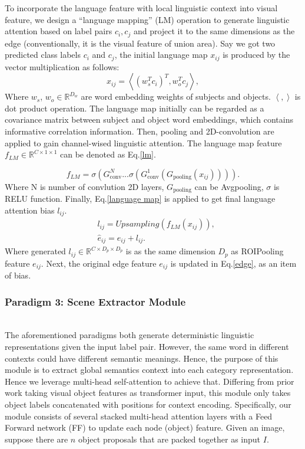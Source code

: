 \documentclass[runningheads]{llncs}
\begin{document}
To incorporate	the language feature with local linguistic context into visual
feature, we design a ``language mapping'' (LM) operation to generate linguistic
attention based on label pairs $c_{i}, c_{j}$ and project it to the same
dimensions as the edge (conventionally, it is the visual feature of union
area). Say we got two predicted class labels $c_{i}$ and $c_{j}$,
the initial language map $x_{ij}$ is produced by the vector multiplication as
follows:
\begin{equation}
  \label{in}x_{ij}=\left< (w^{T}_{s}c_{i})^T, w_{o}^{T}c_{j} \right>,
\end{equation}
Where $w_{s}$, ${w_{o}\in \mathbb{R}^{D_{w}}}$ are word embedding
weights of subjects and objects. $\left<,\right> $ is dot product operation.
The language map initially can be regarded as a covariance matrix between
subject and object word embeddings, which contains informative correlation
information.
Then, pooling and 2D-convolution are applied to gain channel-wised linguistic
attention. The language map feature $f_{LM}\in \mathbb{R}^{C \times 1\times 1}$
can be denoted as  Eq.\ref{lm}.



\begin{equation}
  f_{LM}=\sigma (G^{N}_{\operatorname{conv}}...\sigma
  (G^{1}_{\operatorname{conv}}(G_{\operatorname{pooling}}(x_{ij})))).
  \label{lm}
\end{equation}
Where N is number of convlution 2D layers, $G_{\operatorname{pooling}}$ can be
Avgpooling, $\sigma$ is RELU function.
Finally, Eq.\ref{language map}	is applied to get final language attention bias
$l_{ij}$.
\begin{align}
  \label{language map} & l_{ij}=Upsampling(f_{LM}\left(x_{ij}\right)),
  \\
  \label{edge}         & \hat{e}_{ij}= e_{ij}+l_{ij}.
\end{align}
Where generated $l_{ij} \in \mathbb{R}^{C \times D_{p}\times D_{p}}$ is as the
same dimension $D_{p}$ as ROIPooling  feature $e_{ij} $. Next, the original
edge feature ${e}_{ij}$ is updated in Eq.\ref{edge}, as an item of bias.

\subsubsection{Paradigm 3: Scene Extractor Module}~\\

The aforementioned paradigms both generate deterministic linguistic
representations given the input label pair. However, the same word in different
contexts could have different semantic meanings. Hence, the purpose of this
module is to extract global semantics context into each category
representation. Hence we leverage multi-head self-attention to achieve that.
Differing from prior work\cite{seq2seq} taking visual object features as
transformer input, this module only takes object labels concatenated with
positions for context encoding.  Specifically, our module consists of several
stacked multi-head attention layers with a Feed Forward network (FF) to update
each node (object) feature. Given an image, suppose there are $ {n}$ object
proposals that are packed together as input $ {I}$.
\end{document}
